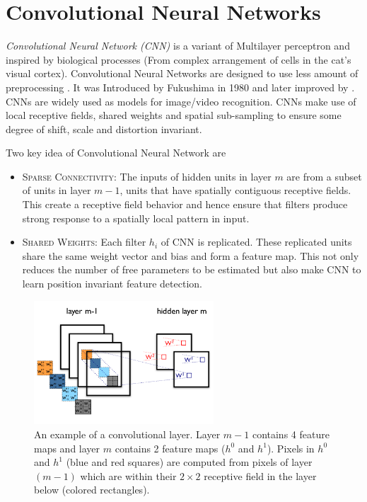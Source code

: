 \section{Convolutional Neural Networks}
\emph{Convolutional Neural Network (CNN)} is a variant of Multilayer perceptron  and inspired by biological processes (From complex arrangement of cells in the cat’s visual cortex). Convolutional Neural Networks are designed to use less amount of preprocessing \cite{lecun1998gradient}. It was Introduced by Fukushima in 1980 and later  improved by \citet{lecun1998gradient}. CNNs are widely used as models for  image/video recognition. CNNs make use of local receptive fields, shared weights and spatial sub-sampling to ensure some degree of shift, scale and distortion invariant.

\noindent Two key idea of Convolutional Neural Network are
\begin{itemize}
\item \textsc{Sparse Connectivity:} The inputs of hidden units in layer $m$ are from a subset of units in layer $m-1$, units that have spatially contiguous receptive fields. This create a receptive field behavior and hence ensure that filters produce strong response to a spatially local pattern in input.


\item \textsc{Shared Weights:} Each filter $h_i$ of CNN is replicated. These replicated units share the same weight vector and bias and form a feature map. This not only reduces the number of free parameters to be estimated but also make CNN to learn position invariant feature detection.
\end{itemize}

\begin{figure}[!ht]
\centering
\includegraphics[width=0.6\textwidth]{./imgs/convolution.png} 
\caption[convolutional layer explained]{An example of a convolutional layer. Layer $m-1$ contains 4 feature maps and layer $m$ contains 2 feature maps ($h^0$ and $h^1$). Pixels in $h^0$ and $h^1$ (blue and red squares) are computed from pixels of layer $(m-1)$ which are within their $2\times2$ receptive field in the layer below (colored rectangles).}
\label{fig:cnn_layer}
\end{figure}


